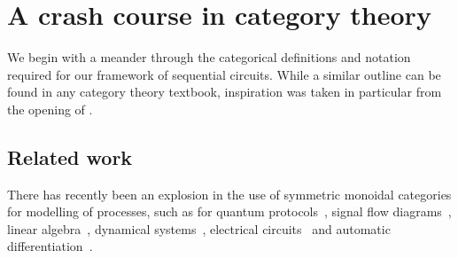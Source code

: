\chapter{A crash course in category theory}

We begin with a meander through the categorical definitions and notation
required for our framework of sequential circuits.
While a similar outline can be found in any category theory textbook,
inspiration was taken in particular from the opening of
\cite{ghica2023hierarchical}.















\section{Related work}

There has recently been an explosion in the use of symmetric monoidal categories
for modelling of processes, such as for quantum
protocols~\cite{abramsky2004categorical}, signal flow
diagrams~\cite{bonchi2014categorical,bonchi2015full}, linear
algebra~\cite{bonchi2017interacting,zanasi2015interacting,bonchi2019graphical,boisseau2022graphical},
dynamical systems~\cite{baez2015categories,fong2016categorical}, electrical
circuits~\cite{boisseau2022string} and automatic
differentiation~\cite{alvarez-picallo2023functorial}.